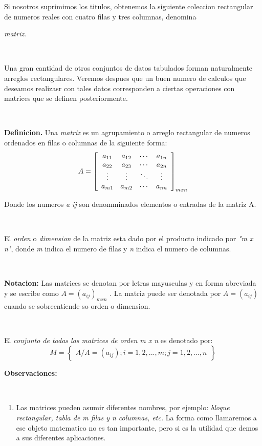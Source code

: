 \documentclass[11pt, conference]{IEEEtran}
\begin{document}
Si nosotros suprimimos los titulos, obtenemos la siguiente coleccion rectangular de numeros reales con cuatro filas y tres columnas, denomina {\textit{matriz}.

\

Una gran cantidad de otros conjuntos de datos tabulados forman naturalmente arreglos rectangulares. Veremos despues que un buen numero de calculos que deseamos realizasr con tales datos corresponden a ciertas operaciones con matrices que se definen posteriormente. 

\

{\bf Definicion.} Una {\textit{matriz}} es un agrupamiento  o arreglo rectangular de numeros ordenados en filas o columnas de la siguiente forma:
\[ A = \left[
\begin{array}{c c c c} 
a_{11} &a_{12}&\cdots &a_ {1n} \\
a_{22} &a_{23}&\cdots & a_{2n} \\
\vdots&\vdots&\ddots & \vdots \\
a_ {m1} & a_ {m2} &\cdots& a_{nn}
\end{array} \right] _ {mxn} \]

Donde los numeros {\textit {a ij} } son denomminados elementos o entradas de la matriz A.

\  

El {\textit{ orden}} o {\textit{dimension}} de la matriz 
esta dado por el producto indicado por {\textit{"m x n"}}, donde {\textit{m}} indica el numero de filas y {\textit{n}} indica el numero de columnas.

\

{\bf Notacion:} Las matrices se denotan por letras mayusculas y en forma abreviada y se escribe como $ A = (a_{ij})_ {mxn} $  . La matriz puede ser denotada por $ A=(a_{ij} )$ cuando se sobreentiende so orden o dimension.

\ 

El {\textit{conjunto de todas las matrices de orden  m x n}} es denotado por:
\[ M=
\left\{ \begin{array}{c}
A/A=(a_{ij}); i=1,2, ... ,m; j=1,2, ...,n
\end{array} \right\}  \]

{\bf Observaciones:}

\

\begin{enumerate} 
\item
Las matrices pueden asumir diferentes nombres, por ejemplo: {\textit{bloque rectangular, tabla de m filas y n columnas, etc.}} La forma como llamaremos a ese objeto matematico no es tan importante, pero si es la utilidad que demos a sus diferentes aplicaciones.


\end{enumerate}}
\end{document}
